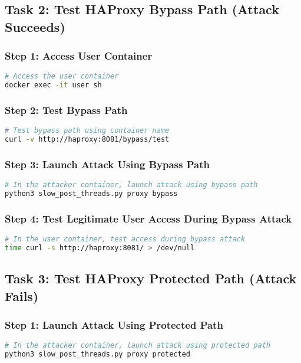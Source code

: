 \documentclass[12pt]{article}
\begin{document}
\subsection{Task 2: Test HAProxy Bypass Path (Attack Succeeds)}

\subsubsection{Step 1: Access User Container}
\begin{lstlisting}[language=bash]
# Access the user container
docker exec -it user sh
\end{lstlisting}

\subsubsection{Step 2: Test Bypass Path}
\begin{lstlisting}[language=bash]
# Test bypass path using container name
curl -v http://haproxy:8081/bypass/test
\end{lstlisting}

\subsubsection{Step 3: Launch Attack Using Bypass Path}
\begin{lstlisting}[language=bash]
# In the attacker container, launch attack using bypass path
python3 slow_post_threads.py proxy bypass
\end{lstlisting}

\subsubsection{Step 4: Test Legitimate User Access During Bypass Attack}
\begin{lstlisting}[language=bash]
# In the user container, test access during bypass attack
time curl -s http://haproxy:8081/ > /dev/null
\end{lstlisting}

\subsection{Task 3: Test HAProxy Protected Path (Attack Fails)}

\subsubsection{Step 1: Launch Attack Using Protected Path}
\begin{lstlisting}[language=bash]
# In the attacker container, launch attack using protected path
python3 slow_post_threads.py proxy protected
\end{lstlisting}
\end{document}
